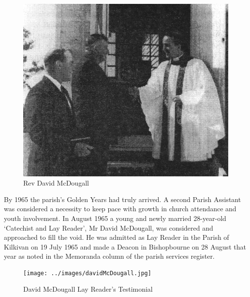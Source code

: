 \begin{figure}
\begin{center}
\includegraphics[width=1.\linewidth,center]{../images/DMcDougall.jpg}
\caption{Rev David McDougall}
\end{center}
\end{figure}




By 1965 the parish's Golden Years had truly arrived. A second Parish Assistant was considered a necessity to keep pace with growth in church attendance and youth involvement. In August 1965 a young and newly married 28-year-old `Catechist and Lay Reader', Mr David McDougall, was considered and approached to fill the void. He was admitted as Lay Reader in the Parish of Kilkivan on 19 July 1965 and made a Deacon in Bishopbourne on 28 August that year as noted in the Memoranda column of the parish services register.









\begin{figure}[!htb]
\begin{center}
\texttt{[image: ../images/davidMcDougall.jpg]}
\caption{David McDougall Lay Reader's Testimonial}
\end{center}
\end{figure}




